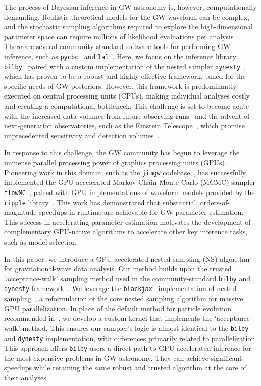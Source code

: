\documentclass[fleqn,usenatbib]{mnras}
\begin{document}
The process of Bayesian inference in GW astronomy is, however, computationally
demanding. Realistic theoretical models for the GW waveform can be complex, and the
stochastic sampling algorithms required to explore the high-dimensional parameter
space can require millions of likelihood evaluations per analysis~\citep{LIGO_guide_signalextraction}.
There are several community-standard software tools for performing GW inference, such as
\texttt{pycbc}~\citep{pycbc} and \texttt{lal}~\citep{lal}.
Here, we focus on the inference library \texttt{bilby}~\citep{bilby_paper}
paired with a custom implementation of the nested sampler \texttt{dynesty}~\citep{dynesty}, 
which has proven to be a robust and highly effective framework, tuned for the specific needs of GW posteriors.
However, this framework is predominantly executed on central processing units
(CPUs), making individual analyses costly and creating a
computational bottleneck. This challenge is set to become acute with the
increased data volumes from future observing runs~\citep{aLIGO, aVirgo, aLVK_prospects} and the advent of
next-generation observatories, such as the Einstein Telescope~\citep{ET_science_case}, which promise
unprecedented sensitivity and detection volumes~\citep{HuAccelerationReview}.

In response to this challenge, the GW community has begun to leverage the immense
parallel processing power of graphics processing units (GPUs). Pioneering work in
this domain, such as the \texttt{jimgw} codebase~\citep{wong2023fastgravitationalwaveparameter}, has successfully
implemented the GPU-accelerated Markov Chain Monte Carlo (MCMC) sampler \texttt{flowMC}~\citep{flowMC}, 
paired with GPU implementations of waveform models provided by the
\texttt{ripple} library~\citep{ripple}. This work has demonstrated that
substantial, orders-of-magnitude speedups in runtime are
achievable for GW parameter estimation. This success in accelerating
parameter estimation motivates the development of complementary
GPU-native algorithms to accelerate other key inference tasks, such as 
model selection.

In this paper, we introduce a GPU-accelerated nested sampling (NS)
algorithm for gravitational-wave data analysis. Our method
builds upon the trusted `acceptance-walk' sampling method used in the
community-standard \texttt{bilby} and \texttt{dynesty} framework~\citep{bilby_paper}.
We leverage the \texttt{blackjax}~\citep{jax2018github,cabezas2024blackjax} implementation of nested sampling~\citep{yallup2025nested}, 
a reformulation of the core nested sampling algorithm for massive GPU parallelization. 
In place of the default method for particle evolution recommended in~\cite{yallup2025nested}, we develop a custom
kernel that implements the `acceptance-walk' method.
This ensures our sampler's logic is almost identical to the
\texttt{bilby} and \texttt{dynesty} implementation, with differences
primarily related to parallelization. This approach offers
\texttt{bilby} users a direct path to GPU-accelerated inference for the most expensive problems in GW astronomy.
They can achieve significant speedups while retaining the same
robust and trusted algorithm at the core of their analyses.
\end{document}
